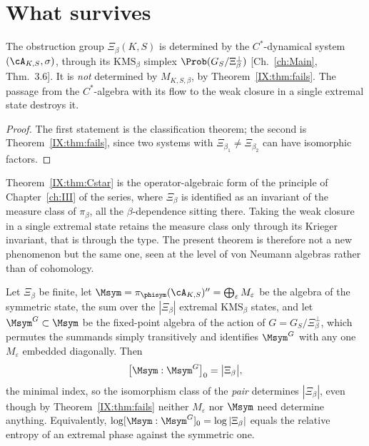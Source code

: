 \section{What survives}

\begin{theorem}\label{IX:thm:Cstar}
The obstruction group $\Xi_\beta(K,S)$ is determined by the $C^*$-dynamical system
$(\cA_{K,S},\sigma)$, through its $\mathrm{KMS}_\beta$ simplex
$\Prob(G_S/\Xi_\beta^\perp)$ [Ch.~\ref{ch:Main}, Thm.~3.6]. It is \emph{not} determined by
$M_{K,S,\beta}$, by Theorem~\ref{IX:thm:fails}. The passage from the $C^*$-algebra with its
flow to the weak closure in a single extremal state destroys it.
\end{theorem}

\begin{proof}
The first statement is the classification theorem; the second is Theorem~\ref{IX:thm:fails},
since two systems with $\Xi_{\beta_1}\ne\Xi_{\beta_2}$ can have isomorphic factors.
\end{proof}

\begin{remark}\label{IX:rem:measureclass}
Theorem~\ref{IX:thm:Cstar} is the operator-algebraic form of the principle of Chapter~\ref{ch:III} of the
series, where $\Xi_\beta$ is identified as an invariant of the measure class of $\pi_\beta$,
all the $\beta$-dependence sitting there. Taking the weak closure in a single extremal state retains
the measure class only through its Krieger invariant, that is through the type. The present
theorem is therefore not a new phenomenon but the same one, seen at the level of von Neumann
algebras rather than of cohomology.
\end{remark}

\begin{theorem}\label{IX:thm:inclusion}
Let $\Xi_\beta$ be finite, let $\Msym=\pi_{\phisym}(\cA_{K,S})''=\bigoplus_{\varepsilon}M_\varepsilon$
be the algebra of the symmetric state, the sum over the $|\Xi_\beta|$ extremal
$\mathrm{KMS}_\beta$ states, and let $\Msym^{G}\subset\Msym$ be the fixed-point algebra of the
action of $G=G_S/\Xi_\beta^\perp$, which permutes the summands simply transitively and
identifies $\Msym^G$ with any one $M_\varepsilon$ embedded diagonally. Then
\[
\bigl[\Msym:\Msym^{G}\bigr]_0=\bigl|\Xi_\beta\bigr| ,
\]
the minimal index, so the isomorphism class of the \emph{pair} determines $|\Xi_\beta|$,
even though by Theorem~\ref{IX:thm:fails} neither $M_\varepsilon$ nor $\Msym$ need determine
anything. Equivalently, $\log[\Msym:\Msym^G]_0=\log|\Xi_\beta|$ equals the relative entropy
of an extremal phase against the symmetric one.
\end{theorem}

